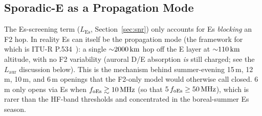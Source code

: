 \documentclass[11pt,a4paper]{article}
\newcommand{\SI}[2]{#1\,\text{#2}}
\newcommand{\MHz}{\text{MHz}}
\newcommand{\km}{\text{km}}
\begin{document}
\subsection{Sporadic-E as a Propagation Mode}\label{sec:es-prop-mode}

The Es-screening term ($L_{\text{Es}}$, Section~\ref{sec:snr}) only
accounts for Es \emph{blocking} an F2 hop.  In reality Es can itself
be the propagation mode (the framework for which is ITU-R
P.534~\cite{itup534}): a single ${\sim}\SI{2000}{\km}$ hop off the
E layer at ${\sim}\SI{110}{\km}$ altitude, with no F2 variability
(auroral D/E absorption \emph{is} still charged; see the
$L_{\text{aur}}$ discussion below).  This is the mechanism behind summer-evening
15\,m, 12\,m, 10\,m, and 6\,m openings that the F2-only model would
otherwise call closed.  6\,m only opens via Es when $f_{\text{oEs}}
\gtrsim \SI{10}{\MHz}$ (so that $5\,f_{\text{oEs}} \ge \SI{50}{\MHz}$),
which is rarer than the HF-band thresholds and concentrated in the
boreal-summer Es season.
\end{document}
